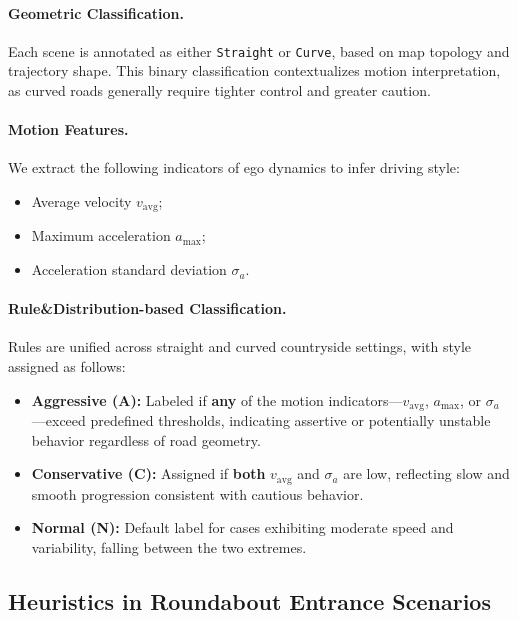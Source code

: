 \documentclass{article}
\begin{document}
\paragraph{Geometric Classification.}
Each scene is annotated as either \texttt{Straight} or \texttt{Curve}, based on map topology and trajectory shape. This binary classification contextualizes motion interpretation, as curved roads generally require tighter control and greater caution.

\paragraph{Motion Features.}
We extract the following indicators of ego dynamics to infer driving style:
\begin{itemize}[leftmargin=1em, topsep=0pt, itemsep=0.3em]
    \item Average velocity $v_{\text{avg}}$;
    \item Maximum acceleration $a_{\max}$;
    \item Acceleration standard deviation $\sigma_a$.
\end{itemize}

\paragraph{Rule\&Distribution-based Classification.}
Rules are unified across straight and curved countryside settings, with style assigned as follows:

\begin{itemize}[leftmargin=1em, topsep=0pt, itemsep=0.3em]
    \item \textbf{Aggressive (A):} 
    Labeled if \textbf{any} of the motion indicators—$v_{\text{avg}}$, $a_{\max}$, or $\sigma_a$—exceed predefined thresholds, indicating assertive or potentially unstable behavior regardless of road geometry.

    \item \textbf{Conservative (C):}
    Assigned if \textbf{both} $v_{\text{avg}}$ and $\sigma_a$ are low, reflecting slow and smooth progression consistent with cautious behavior.

    \item \textbf{Normal (N):}
    Default label for cases exhibiting moderate speed and variability, falling between the two extremes.
\end{itemize}



\subsection{Heuristics in Roundabout Entrance Scenarios}
\end{document}
